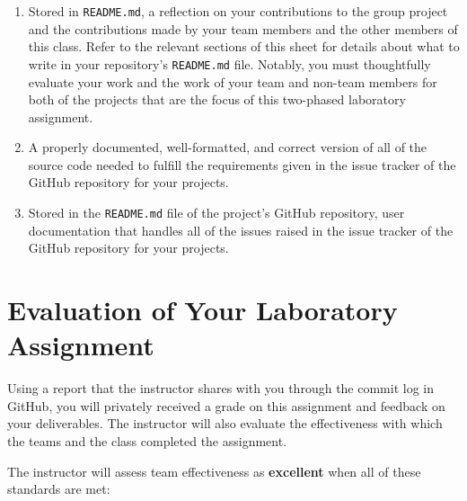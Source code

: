 \documentclass[11pt]{article}
\newcommand{\reflection}{\lstinline{README.md}}
\begin{document}
\begin{enumerate}

\setlength{\itemsep}{0in}

\item Stored in \reflection{}, a reflection on your contributions to the group project and the contributions made by
  your team members and the other members of this class. Refer to the relevant sections of this sheet for details about
  what to write in your repository's \reflection{} file. Notably, you must thoughtfully evaluate your work and the work
  of your team and non-team members for both of the projects that are the focus of this two-phased laboratory assignment.

\item A properly documented, well-formatted, and correct version of all of the source code needed to fulfill the
  requirements given in the issue tracker of the GitHub repository for your projects.

\item Stored in the \reflection{} file of the project's GitHub repository, user documentation that handles all of the
  issues raised in the issue tracker of the GitHub repository for your projects.

\end{enumerate}

\vspace*{-1em}

\section*{Evaluation of Your Laboratory Assignment}

Using a report that the instructor shares with you through the commit log in GitHub, you will privately received a grade
on this assignment and feedback on your deliverables. The instructor will also evaluate the effectiveness with which the
teams and the class completed the assignment.

The instructor will assess team effectiveness as {\bf excellent} when all of these standards are met:

\vspace*{-.5em}
\end{document}
